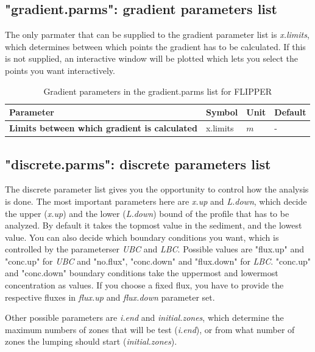 \documentclass[10pt]{article}
\begin{document}
\subsection{"gradient.parms": gradient parameters list}
The only parmater that can be supplied to the gradient parameter list is \textit{x.limits}, which determines between which points the gradient has to be calculated. If this is not supplied, an interactive window will be plotted which lets you select the points you want interactively.

\begin{table}[!h]
	\small
	\caption{Gradient parameters in the gradient.parms list for FLIPPER}
	\begin{tabular}{p{8cm} p{1.5cm} p{1cm} p{1cm}}
		\hline
		\textbf{Parameter} & \textbf{Symbol} & \textbf{Unit} & \textbf{Default} \\     
		 \hline
		\textbf{Limits between which gradient is calculated} & x.limits & $m$ & -  \\
		\hline
	\end{tabular}
	\label{table_gradientparms}
\end{table}

\subsection{"discrete.parms": discrete parameters list}
The discrete parameter list gives you the opportunity to control how the analysis is done. The most important parameters here are \textit{x.up} and \textit{L.down}, which decide the upper (\textit{x.up}) and the lower (\textit{L.down}) bound of the profile that has to be analyzed. By default it takes the topmost value in the sediment, and the lowest value. You can also decide which boundary conditions you want, which is controlled by the parameterser \textit{UBC} and \textit{LBC}. Possible values are "flux.up" and "conc.up" for \textit{UBC} and "no.flux", "conc.down" and "flux.down" for \textit{LBC}. "conc.up" and "conc.down" boundary conditions take the uppermost and lowermost concentration as values. If you choose a fixed flux, you have to provide the respective fluxes in \textit{flux.up} and \textit{flux.down} parameter set.

Other possible parameters are \textit{i.end} and \textit{initial.zones}, which determine the maximum numbers of zones that will be test (\textit{i.end}), or from what number of zones the lumping should start (\textit{initial.zones}).
\end{document}
